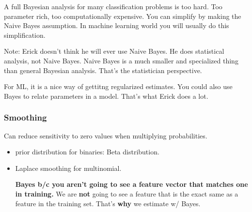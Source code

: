 A full Bayesian analysis for many classification problems is too hard.  Too parameter rich, too computationally expensive.
You can simplify by making the Naive Bayes assumption. 
In machine learning world you will usually do this simplification. 

Note: Erick doesn't think he will ever use Naive Bayes.  
He does statistical analysis, not Naive Bayes.  
Naive Bayes is a much smaller and specialized thing than general Bayesian analysis.
That's the statistician perspective. 

For ML, it is a nice way of gettitng regularized estimates. 
You could also use Bayes to relate parameters in a model. 
That's what Erick does a lot. 

\subsubsection{Smoothing}
Can reduce sensitivity to zero values when multiplying probabilities.
\begin{itemize}
	\item prior distribution for binaries: Beta distribution. 
	\item Laplace smoothing for multinomial. 
	
\textbf{Bayes b/c you aren't going to see a feature vector that matches one in training.}
	We are \textbf{not} going to see a feature that is the exact same as a feature in the training set. 
	That's \textbf{why} we estimate w/ Bayes.   %
\end{itemize}

